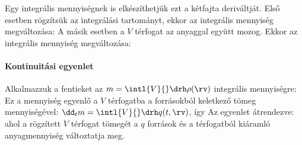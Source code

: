    Egy integrális mennyiségnek is elkészíthetjük ezt a kétfajta deriváltját.
   Első esetben rögzítsük az integrálási tartományt, ekkor az integrális mennyiség megváltozása:
   A másik esetben a $V$ térfogat az anyaggal együtt mozog.
   Ekkor az integrális mennyiség megváltozása: 
   
   \paragraph{Kontinuitási egyenlet}
    
    Alkalmazzuk a fentieket az $m=\intl{V}{}\drh\rho(\rv)$ integrális mennyiségre:
    Ez a mennyiség egyenlő a $V$ térfogatba a forrásokból keletkező tömeg mennyiségével: $\dd_t m=\intl{V}{}\drh q(t,\rv)$, így
    Az egyenlet átrendezve:
    ahol a rögzített $V$ térfogat tömegét a $q$ források és a térfogatból kiáramló anyagmennyiség változtatja meg. 
    
